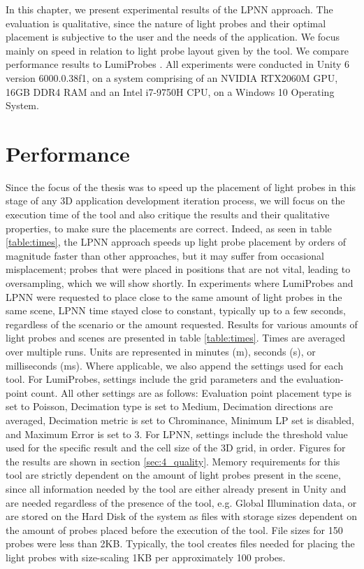 In this chapter, we present experimental results of the LPNN approach. The evaluation is qualitative, since the nature of light probes and their optimal placement is subjective to the user and the needs of the application. We focus mainly on speed in relation to light probe layout given by the tool. We compare performance results to LumiProbes \parencite{Vardis2021}. All experiments were conducted in Unity 6 version 6000.0.38f1, on a system comprising of an NVIDIA RTX2060M GPU, 16GB DDR4 RAM and an Intel i7-9750H CPU, on a Windows 10 Operating System.

\section{Performance}
\label{sec:4_performance}
Since the focus of the thesis was to speed up the placement of light probes in this stage of any 3D application development iteration process, we will focus on the execution time of the tool and also critique the results and their qualitative properties, to make sure the placements are correct. Indeed, as seen in table \ref{table:times}, the LPNN approach speeds up light probe placement by orders of magnitude faster than other approaches, but it may suffer from occasional misplacement; probes that were placed in positions that are not vital, leading to oversampling, which we will show shortly. In experiments where LumiProbes and LPNN were requested to place close to the same amount of light probes in the same scene, LPNN time stayed close to constant, typically up to a few seconds, regardless of the scenario or the amount requested. Results for various amounts of light probes and scenes are presented in table \ref{table:times}. Times are averaged over multiple runs. Units are represented in minutes (m), seconds (s), or milliseconds (ms). Where applicable, we also append the settings used for each tool. For LumiProbes, settings include the grid parameters and the evaluation-point count. All other settings are as follows: Evaluation point placement type is set to Poisson, Decimation type is set to Medium, Decimation directions are averaged, Decimation metric is set to  Chrominance, Minimum LP set is disabled, and Maximum Error is set to 3. For LPNN, settings include the threshold value used for the specific result and the cell size of the 3D grid, in order. Figures for the results are shown in section \ref{sec:4_quality}. Memory requirements for this tool are strictly dependent on the amount of light probes present in the scene, since all information needed by the tool are either already present in Unity and are needed regardless of the presence of the tool, e.g. Global Illumination data, or are stored on the Hard Disk of the system as files with storage sizes dependent on the amount of probes placed before the execution of the tool. File sizes for 150 probes were less than 2KB. Typically, the tool creates files needed for placing the light probes with size-scaling 1KB per approximately 100 probes.

